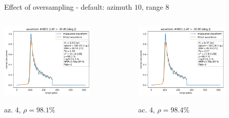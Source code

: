 \documentclass[compress,8pt]{beamer}
\begin{document}
\begin{frame}{Effect of oversampling \textnormal{- default: azimuth $10$, range $8$}}


 \begin{columns}
\begin{column}{0.45\textwidth}\centering

  \includegraphics[width=0.7\textwidth]{fig/wfm_1_num_PTRnum_OSAL4}

  az. $4$, $\rho=98.1\%$
  
\end{column}
\begin{column}{0.45\textwidth}\centering

\includegraphics[width=0.7\textwidth]{fig/wfm_1_num_PTRnum_OSAC4} 

ac. $4$,  $\rho=98.4\%$
  
\end{column}
\end{columns}

\medskip
 \begin{columns}
\begin{column}{0.45\textwidth}\centering


\end{column}
\end{columns}
\end{frame}
\end{document}
